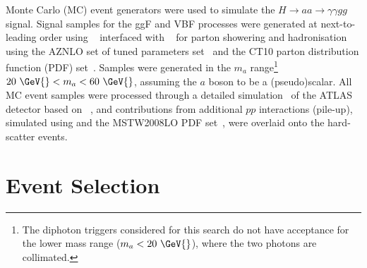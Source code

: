 Monte Carlo (MC) event generators were used to simulate the $H\to aa \to \gamma\gamma gg$ signal.
Signal samples for the ggF and VBF processes were generated at next-to-leading order using 
\POWHEGBOX{}~\cite{Nason:2004rx,Frixione:2007vw,Alioli:2010xd} interfaced with \PYTHIA{}~\cite{Sjostrand:2014zea} for parton showering and hadronisation using the AZNLO set of tuned parameters set~\cite{STDM-2012-23} and the CT10 parton distribution function (PDF) set~\cite{Lai:2010vv}.
Samples were generated in the $m_a$ range\footnote{The diphoton triggers considered for this
search do not have acceptance for the lower mass range ($m_a<20~\GeV{}$), where the two photons are collimated.} 
$20~\GeV{} < m_a < 60~\GeV{}$, assuming the $a$ boson to be a (pseudo)scalar.
All MC event samples were processed through a detailed simulation~\cite{SOFT-2010-01} of the ATLAS detector
based on \geantFour{}~\cite{Agostinelli:2002hh}, and contributions from additional $pp$ interactions (pile-up), simulated using
\PYTHIA{} and the MSTW2008LO PDF set~\cite{Martin:2009iq}, were overlaid onto the hard-scatter events.

\section{Event Selection}
